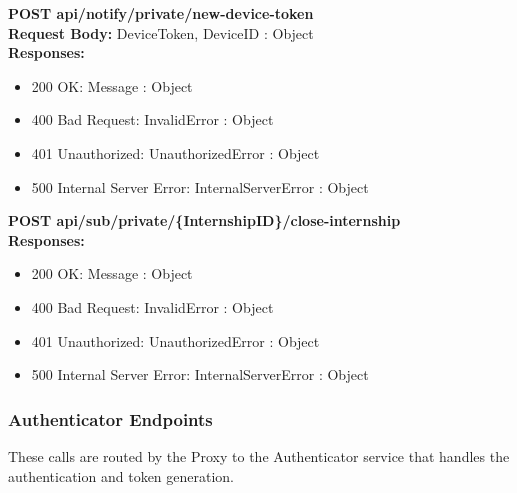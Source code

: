 \noindent\textbf{\color{titleColor}POST api/notify/private/new-device-token}
\vspace{2pt}
\\\textbf{\color{titleColor}Request Body:} DeviceToken, DeviceID : Object 
\vspace{4pt}
\\\textbf{\color{titleColor}Responses:} 
\begin{itemize}
    \item {\color{titleColor}200 OK:} Message : Object
    \item {\color{titleColor}400 Bad Request:} InvalidError : Object
    \item {\color{titleColor}401 Unauthorized:} UnauthorizedError : Object
    \item {\color{titleColor}500 Internal Server Error:} InternalServerError : Object
\end{itemize}
\vspace{10pt}
\noindent{\color{titleColor}\rule{0.8\linewidth}{0.2mm}}
\vspace{10pt}

\noindent\textbf{\color{titleColor}POST api/sub/private/\{InternshipID\}/close-internship}
\vspace{2pt}
\\\textbf{\color{titleColor}Responses:} 
\begin{itemize}
    \item {\color{titleColor}200 OK:} Message : Object
    \item {\color{titleColor}400 Bad Request:} InvalidError : Object
    \item {\color{titleColor}401 Unauthorized:} UnauthorizedError : Object
    \item {\color{titleColor}500 Internal Server Error:} InternalServerError : Object
\end{itemize}
\vspace{10pt}
\noindent{\color{titleColor}\rule{0.8\linewidth}{0.2mm}}
\vspace{10pt}

\subsubsection*{Authenticator Endpoints}\label{authenticator-endpoints}

These calls are routed by the Proxy to the Authenticator service that
handles the authentication and token generation.\\

